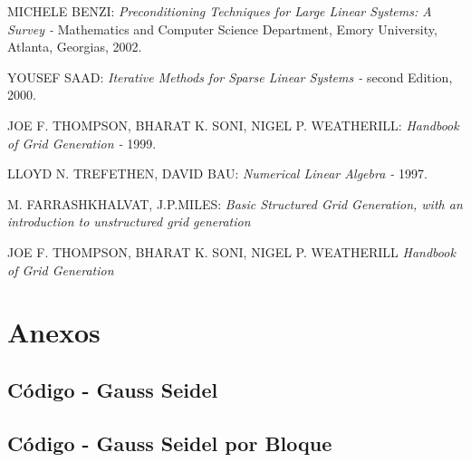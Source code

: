 \documentclass[11pt,letterpaper]{article}
\begin{document}
\clearpage
\begin{thebibliography}{10}
MICHELE BENZI:
\textit{Preconditioning Techniques for Large Linear
Systems: A Survey - }
Mathematics and Computer Science Department, Emory University, Atlanta, Georgias, 2002.
 
YOUSEF SAAD:
\textit{Iterative Methods for Sparse Linear Systems - } 
second Edition, 2000.
 
JOE F. THOMPSON, BHARAT K. SONI, NIGEL P. WEATHERILL:
\textit{Handbook of Grid Generation - }
1999.

LLOYD N. TREFETHEN, DAVID BAU:
\textit{Numerical Linear Algebra - }
1997.

M. FARRASHKHALVAT, J.P.MILES:
\textit{Basic Structured Grid Generation, with an introduction to unstructured grid generation} 

JOE F. THOMPSON, BHARAT K. SONI, NIGEL P. WEATHERILL
\textit{Handbook of Grid Generation} 

\end{thebibliography}

\clearpage
\section{Anexos}
\subsection{Código - Gauss Seidel}

\subsection{Código - Gauss Seidel por Bloque}

\end{document}
